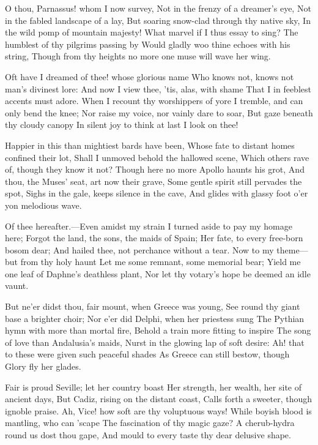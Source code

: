 \documentclass[10pt,twocolumn]{book}
\begin{document}
   O thou, Parnassus! whom I now survey,
   Not in the frenzy of a dreamer's eye,
   Not in the fabled landscape of a lay,
   But soaring snow-clad through thy native sky,
   In the wild pomp of mountain majesty!
   What marvel if I thus essay to sing?
   The humblest of thy pilgrims passing by
   Would gladly woo thine echoes with his string,
Though from thy heights no more one muse will wave her wing.


   Oft have I dreamed of thee! whose glorious name
   Who knows not, knows not man's divinest lore:
   And now I view thee, 'tis, alas, with shame
   That I in feeblest accents must adore.
   When I recount thy worshippers of yore
   I tremble, and can only bend the knee;
   Nor raise my voice, nor vainly dare to soar,
   But gaze beneath thy cloudy canopy
In silent joy to think at last I look on thee!


   Happier in this than mightiest bards have been,
   Whose fate to distant homes confined their lot,
   Shall I unmoved behold the hallowed scene,
   Which others rave of, though they know it not?
   Though here no more Apollo haunts his grot,
   And thou, the Muses' seat, art now their grave,
   Some gentle spirit still pervades the spot,
   Sighs in the gale, keeps silence in the cave,
And glides with glassy foot o'er yon melodious wave.


   Of thee hereafter.---Even amidst my strain
   I turned aside to pay my homage here;
   Forgot the land, the sons, the maids of Spain;
   Her fate, to every free-born bosom dear;
   And hailed thee, not perchance without a tear.
   Now to my theme---but from thy holy haunt
   Let me some remnant, some memorial bear;
   Yield me one leaf of Daphne's deathless plant,
Nor let thy votary's hope be deemed an idle vaunt.


   But ne'er didst thou, fair mount, when Greece was young,
   See round thy giant base a brighter choir;
   Nor e'er did Delphi, when her priestess sung
   The Pythian hymn with more than mortal fire,
   Behold a train more fitting to inspire
   The song of love than Andalusia's maids,
   Nurst in the glowing lap of soft desire:
   Ah! that to these were given such peaceful shades
As Greece can still bestow, though Glory fly her glades.


   Fair is proud Seville; let her country boast
   Her strength, her wealth, her site of ancient days,
   But Cadiz, rising on the distant coast,
   Calls forth a sweeter, though ignoble praise.
   Ah, Vice! how soft are thy voluptuous ways!
   While boyish blood is mantling, who can 'scape
   The fascination of thy magic gaze?
   A cherub-hydra round us dost thou gape,
And mould to every taste thy dear delusive shape.
\end{document}

